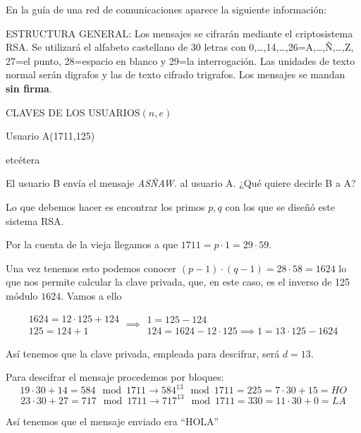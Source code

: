 \begin{problem}[3]
En la guía de una red de comunicaciones aparece la siguiente
información:

ESTRUCTURA GENERAL: Los mensajes se cifrarán mediante el
criptosistema RSA. Se utilizará el alfabeto castellano de 30
letras  con 0,\dots,14,\dots,26=A,\dots,Ñ,\dots,Z, 27=el punto,
28=espacio en blanco y 29=la interrogación. Las unidades de texto
normal serán digrafos y las de texto cifrado trigrafos. Los mensajes se mandan
{\bf sin firma}.

 CLAVES DE LOS
USUARIOS\dotfill$(n,e)$

Usuario A\dotfill(1711,125)

etcétera
\vspace{2mm}

  El usuario B envía el mensaje {\it ASÑAW.} al usuario A.   ¿Qué quiere decirle B a A?
\solution


Lo que debemos hacer es encontrar los primos $p,q$ con los que se diseñó este sistema RSA.

Por la cuenta de la vieja llegamos a que $1711=p\cdot 1 = 29 \cdot 59$.

Una vez tenemos esto podemos conocer $(p-1)\cdot (q-1)=28 \cdot 58 = 1624$ lo que nos permite calcular la clave privada, que, en este caso, es el inverso de 125 módulo $1624$. Vamos a ello

\[
\begin{array}{l}
1624 = 12 \cdot 125 + 124\\
125 = 124 + 1
\end{array} \implies \begin{array}{l}
1 = 125 -124 \\
124 = 1624 - 12 \cdot 125 \implies 1 = 13 \cdot 125 - 1624
\end{array}
\]

Así tenemos que la clave privada, empleada para descifrar, será $d=13$.

Para descifrar el mensaje procedemos por bloques:
\[19\cdot 30 + 14 = 584 \mod 1711 \to 584^{13} \mod 1711 = 225 = 7\cdot 30 + 15 = HO\]
\[23 \cdot 30 + 27 = 717 \mod 1711 \to 717^{13} \mod 1711 = 330 = 11 \cdot 30 + 0 = LA\]

Así tenemos que el mensaje enviado era ``HOLA''
\end{problem}

